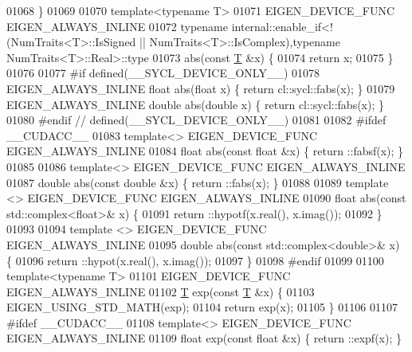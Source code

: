 \begin{DoxyCode}
01068 \}
01069 
01070 \textcolor{keyword}{template}<\textcolor{keyword}{typename} T>
01071 EIGEN\_DEVICE\_FUNC EIGEN\_ALWAYS\_INLINE
01072 \textcolor{keyword}{typename} internal::enable\_if<!(NumTraits<T>::IsSigned || NumTraits<T>::IsComplex),\textcolor{keyword}{typename} 
      NumTraits<T>::Real>::type
01073 abs(\textcolor{keyword}{const} \hyperlink{group___sparse_core___module_class_eigen_1_1_triplet}{T} &x) \{
01074   \textcolor{keywordflow}{return} x;
01075 \}
01076 
01077 \textcolor{preprocessor}{#if defined(\_\_SYCL\_DEVICE\_ONLY\_\_)}
01078 EIGEN\_ALWAYS\_INLINE \textcolor{keywordtype}{float}   abs(\textcolor{keywordtype}{float} x) \{ \textcolor{keywordflow}{return} cl::sycl::fabs(x); \}
01079 EIGEN\_ALWAYS\_INLINE \textcolor{keywordtype}{double}  abs(\textcolor{keywordtype}{double} x) \{ \textcolor{keywordflow}{return} cl::sycl::fabs(x); \}
01080 \textcolor{preprocessor}{#endif // defined(\_\_SYCL\_DEVICE\_ONLY\_\_)}
01081 
01082 \textcolor{preprocessor}{#ifdef \_\_CUDACC\_\_}
01083 \textcolor{keyword}{template}<> EIGEN\_DEVICE\_FUNC EIGEN\_ALWAYS\_INLINE
01084 \textcolor{keywordtype}{float} abs(\textcolor{keyword}{const} \textcolor{keywordtype}{float} &x) \{ return ::fabsf(x); \}
01085 
01086 \textcolor{keyword}{template}<> EIGEN\_DEVICE\_FUNC EIGEN\_ALWAYS\_INLINE
01087 \textcolor{keywordtype}{double} abs(\textcolor{keyword}{const} \textcolor{keywordtype}{double} &x) \{ return ::fabs(x); \}
01088 
01089 \textcolor{keyword}{template} <> EIGEN\_DEVICE\_FUNC EIGEN\_ALWAYS\_INLINE
01090 \textcolor{keywordtype}{float} abs(\textcolor{keyword}{const} std::complex<float>& x) \{
01091   return ::hypotf(x.real(), x.imag());
01092 \}
01093 
01094 \textcolor{keyword}{template} <> EIGEN\_DEVICE\_FUNC EIGEN\_ALWAYS\_INLINE
01095 \textcolor{keywordtype}{double} abs(\textcolor{keyword}{const} std::complex<double>& x) \{
01096   return ::hypot(x.real(), x.imag());
01097 \}
01098 \textcolor{preprocessor}{#endif}
01099 
01100 \textcolor{keyword}{template}<\textcolor{keyword}{typename} T>
01101 EIGEN\_DEVICE\_FUNC EIGEN\_ALWAYS\_INLINE
01102 \hyperlink{group___sparse_core___module_class_eigen_1_1_triplet}{T} exp(\textcolor{keyword}{const} \hyperlink{group___sparse_core___module_class_eigen_1_1_triplet}{T} &x) \{
01103   EIGEN\_USING\_STD\_MATH(exp);
01104   \textcolor{keywordflow}{return} exp(x);
01105 \}
01106 
01107 \textcolor{preprocessor}{#ifdef \_\_CUDACC\_\_}
01108 \textcolor{keyword}{template}<> EIGEN\_DEVICE\_FUNC EIGEN\_ALWAYS\_INLINE
01109 \textcolor{keywordtype}{float} exp(\textcolor{keyword}{const} \textcolor{keywordtype}{float} &x) \{ return ::expf(x); \}

\end{DoxyCode}
